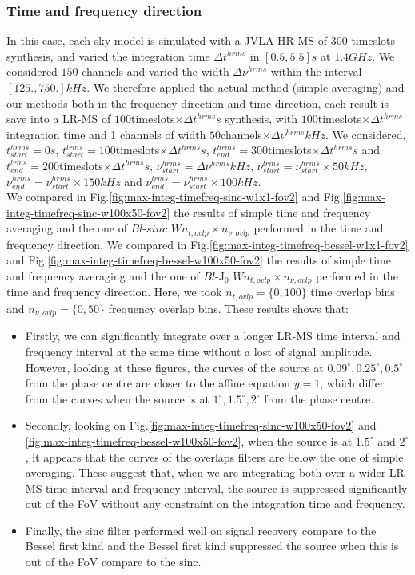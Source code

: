 \documentclass[useAMS,usenatbib]{mn2e}
\begin{document}
\subsubsection{Time and frequency direction}
In this case, each sky model is simulated with a JVLA HR-MS of $300$ timeslots synthesis, and varied  the integration time $\Delta 
t^{hrms}$ in $[0.5,5.5]s$ at $1.4GHz$.  We considered $150$ channels and varied the width $\Delta \nu^{hrms}$  within the interval $[ 
125.,750.]kHz$. We therefore applied the actual method (simple averaging) and our methods both in the frequency direction and time 
direction, each result is save into a LR-MS of  $100$timeslots$\times\Delta t^{hrms}s$ synthesis, with $100$timeslots$\times\Delta 
t^{hrms}$ integration time and 1 channels of width $50$channels$\times\Delta \nu^{hrms}kHz$. We considered, $t^{hrms}_{start}=0s$, 
$t^{lrms}_{start}=100$timeslots$\times\Delta t^{hrms} s$, $t^{hrms}_{end}=300$timeslots$\times\Delta t^{hrms}s$ and 
$t^{lrms}_{end}=200$timeslots$\times\Delta t^{hrms}s$, $\nu^{hrms}_{start}=\Delta \nu^{hrms}kHz$, 
$\nu^{lrms}_{start}=\nu^{hrms}_{start}\times50 kHz$, $\nu^{hrms}_{end}=\nu^{hrms}_{start}\times150 kHz$ and 
$\nu^{lrms}_{end}=\nu^{hrms}_{start}\times100 kHz$.\\ 
We compared in Fig.\ref{fig:max-integ-timefreq-sinc-w1x1-fov2} and Fig.\ref{fig:max-integ-timefreq-sinc-w100x50-fov2}  the results of 
simple time and frequency averaging and the one of  $Bl$-$sinc$ $W n_{t,ovlp}\times n_{\nu,ovlp}$ performed in the time and frequency 
direction. We compared in Fig.\ref{fig:max-integ-timefreq-bessel-w1x1-fov2} and Fig.\ref{fig:max-integ-timefreq-bessel-w100x50-fov2} the 
results of simple time and frequency averaging and the one of  $Bl$-J$_0$ $W n_{t,ovlp}\times n_{\nu,ovlp}$ performed in the time and 
frequency direction. Here, we took $n_{t,ovlp}=\{0,100\}$ time overlap bins and $n_{\nu,ovlp}=\{0,50\}$ frequency overlap bins. These 
results shows that:
\begin{itemize}
 \item Firstly, we can significantly integrate over a longer LR-MS time interval and frequency interval at the same time without a lost of 
signal amplitude. However, looking at these figures, the curves of the source at $0.09^{\circ},0.25^{\circ},0.5^{\circ}$ from the phase 
centre are closer to the affine equation $y=1$, which differ from the curves when the source is at $1^{\circ},1.5^{\circ}, 2^{\circ}$ from 
the phase centre. 
 \item Secondly, looking on Fig.\ref{fig:max-integ-timefreq-sinc-w100x50-fov2} and \ref{fig:max-integ-timefreq-bessel-w100x50-fov2}, when 
the source is at $1.5^{\circ}$ and $2^{\circ}$, it appears that the curves of the overlaps filters are below the one of simple averaging. 
These suggest that, when we are integrating both over a wider LR-MS time interval and frequency interval, the source is suppressed 
significantly out of the FoV without any constraint on the integration time and frequency.
 \item Finally, the sinc filter performed well on signal recovery compare to the Bessel first kind and the Bessel first kind suppressed the 
source when this is out of the FoV compare to the sinc.  
\end{itemize}
\end{document}
